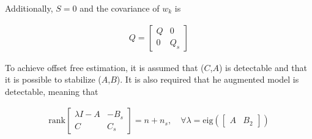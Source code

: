 Additionally, $S = 0$ and the covariance of $w_k$ is

\begin{align}
    Q = \begin{bmatrix}
        Q & 0 \\
        0 & Q_s
    \end{bmatrix}
\end{align}

To achieve offset free estimation, it is assumed that ($C$,$A$) is detectable and that it is possible to stabilize ($A$,$B$). It is also required that he augmented model is detectable, meaning that

\begin{align}
    \mathrm{rank}\begin{bmatrix}
        \lambda I - A & -B_s \\
        C & C_s
    \end{bmatrix} = n + n_s, \quad \forall \lambda =  \mathrm{eig} \left( \begin{bmatrix}
        A & B_2
    \end{bmatrix} \right)
\end{align}